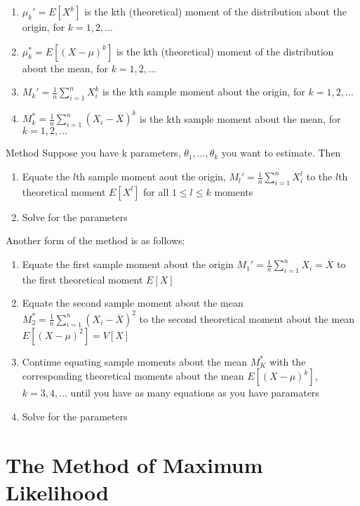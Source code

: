 \documentclass[12pt, a4paper, twoside, openright, titlepage]{book}
\begin{document}
\begin{defn}{}{}
    \leavevmode
    \begin{enumerate}
        \item $\mu_k' = E[X^k]$ is the kth (theoretical) moment of the distribution about the origin, for $k = 1,2,...$
        \item $\mu_k^* = E[(X-\mu)^k]$ is the kth (theoretical) moment of the distribution about the mean, for $k = 1,2,...$
        \item $M_k' = \frac{1}{n}\sum_{i=1}^nX_i^k$ is the kth sample moment about the origin, for $k = 1,2,...$
        \item $M_k^* = \frac{1}{n}\sum_{i=1}^n(X_i-\overline{X})^k$ is the kth sample moment about the mean, for $k = 1,2,...$
    \end{enumerate}
\end{defn}

\begin{proc}{Method}{}
    Suppose you have k parameters, $\theta_1,...,\theta_k$ you want to estimate. Then \begin{enumerate}
        \item Equate the $l$th sample moment aout the origin, $M_l' = \frac{1}{n}\sum_{i=1}^nX_i^l$ to the $l$th theoretical moment $E[X^l]$ for all $1 \leq l \leq k$ moments
        \item Solve for the parameters
    \end{enumerate}
    Another form of the method is as follows: \begin{enumerate}
        \item Equate the first sample moment about the origin $M_1' = \frac{1}{n}\sum_{i=1}^nX_i = \overline{X}$ to the first theoretical moment $E[X]$ 
        \item Equate the second sample moment about the mean $M_2^* = \frac{1}{n}\sum_{i=1}^n(X_i - \overline{X})^2$ to the second theoretical moment about the mean $E[(X-\mu)^2] = V[X]$
        \item Continue equating sample moments about the mean $M_K^*$ with the corresponding theoretical moments about the mean $E[(X-\mu)^k]$, $k =3,4,...$ until you have as many equations as you have paramaters
        \item Solve for the parameters
    \end{enumerate}
\end{proc}

\section{\textsection The Method of Maximum Likelihood}
\end{document}
